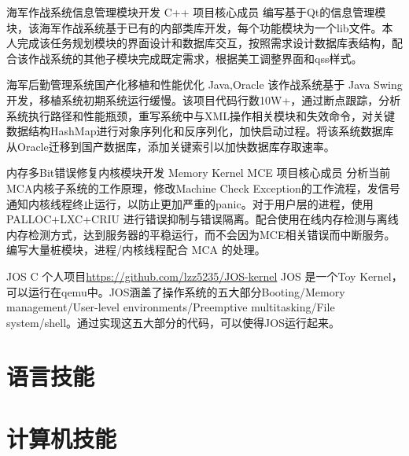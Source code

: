\documentclass[11pt,a4paper]{moderncv}
\begin{document}
{海军作战系统信息管理模块开发}
{C++}
{}{项目核心成员}
{编写基于Qt的信息管理模块，该海军作战系统基于已有的内部类库开发，每个功能模块为一个lib文件。本人完成该任务规划模块的界面设计和数据库交互，按照需求设计数据库表结构，配合该作战系统的其他子模块完成既定需求，根据美工调整界面和qss样式。}

{海军后勤管理系统国产化移植和性能优化}
{Java,Oracle}
{}{}
{该作战系统基于 Java Swing 开发，移植系统初期系统运行缓慢。该项目代码行数10W+，通过断点跟踪，分析系统执行路径和性能瓶颈，重写系统中与XML操作相关模块和失效命令，对关键数据结构HashMap进行对象序列化和反序列化，加快启动过程。将该系统数据库从Oracle迁移到国产数据库，添加关键索引以加快数据库存取速率。}

{内存多Bit错误修复内核模块开发}
{Memory Kernel MCE}
{}{项目核心成员}
{分析当前MCA内核子系统的工作原理，修改Machine Check Exception的工作流程，发信号通知内核线程终止运行，以防止更加严重的panic。对于用户层的进程，使用PALLOC+LXC+CRIU 进行错误抑制与错误隔离。配合使用在线内存检测与离线内存检测方式，达到服务器的平稳运行，而不会因为MCE相关错误而中断服务。编写大量桩模块，进程/内核线程配合 MCA 的处理。}

{JOS}
{C}
{个人项目}{\url{https://github.com/lzz5235/JOS-kernel}}
{JOS 是一个Toy Kernel，可以运行在qemu中。JOS涵盖了操作系统的五大部分Booting/Memory management/User-level environments/Preemptive multitasking/File system/shell。通过实现这五大部分的代码，可以使得JOS运行起来。}



\section{语言技能}

\section{计算机技能}
\end{document}
